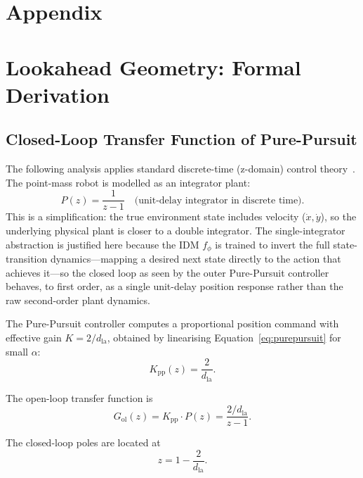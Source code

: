 \documentclass[12pt, a4paper, oneside]{report}
\theoremstyle{definition}
\newcommand{\dlookahead}{d_{\mathrm{la}}}
\begin{document}
\chapter*{Appendix}
{}

\appendix

\chapter{Lookahead Geometry: Formal Derivation}
\label{app:lookahead}

\section*{Closed-Loop Transfer Function of Pure-Pursuit}

The following analysis applies standard discrete-time (z-domain)
control theory~\citep{ogata1995discrete}. The point-mass robot is
modelled as an integrator plant:
\begin{equation}
  P(z) = \frac{1}{z - 1}
  \quad\text{(unit-delay integrator in discrete time)}.
\end{equation}
This is a simplification: the true environment state includes
velocity ($\dot{x}, \dot{y}$), so the underlying physical plant is
closer to a double integrator. The single-integrator abstraction is
justified here because the IDM $f_\phi$ is trained to invert the
full state-transition dynamics---mapping a desired next state
directly to the action that achieves it---so the closed loop as
seen by the outer Pure-Pursuit controller behaves, to first order,
as a single unit-delay position response rather than the raw
second-order plant dynamics.

The Pure-Pursuit controller computes a proportional position
command with effective gain $K = 2/\dlookahead$, obtained by
linearising Equation~\eqref{eq:purepursuit} for small $\alpha$:
\begin{equation}
  K_{\mathrm{pp}}(z) = \frac{2}{\dlookahead}.
\end{equation}

The open-loop transfer function is
\begin{equation}
  G_{\mathrm{ol}}(z) = K_{\mathrm{pp}} \cdot P(z)
    = \frac{2/\dlookahead}{z-1}.
\end{equation}

The closed-loop poles are located at
\begin{equation}
  z = 1 - \frac{2}{\dlookahead}.
\end{equation}
\end{document}
